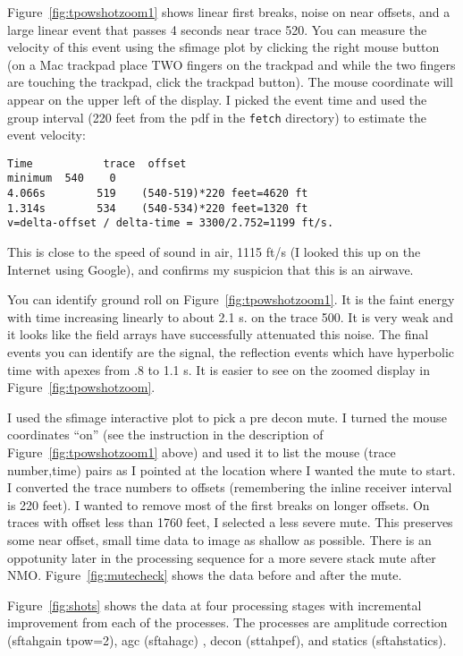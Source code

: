 Figure~\ref{fig:tpowshotzoom1} shows linear first breaks, noise on near offsets, and a large linear event that passes 4 seconds near trace 520.  You can measure the velocity of this event using the sfimage plot by clicking the right mouse button (on a Mac trackpad place TWO fingers on the trackpad and while the two fingers are touching the trackpad, click the trackpad button).  The mouse coordinate will appear on the upper left of the display.  I picked the event time and used the group interval (220 feet from the pdf in the \texttt{fetch} directory) to estimate the event velocity:
\begin{verbatim}  
Time           trace  offset
minimum  540    0
4.066s        519    (540-519)*220 feet=4620 ft
1.314s        534    (540-534)*220 feet=1320 ft
v=delta-offset / delta-time = 3300/2.752=1199 ft/s.
\end{verbatim}  

This is close to the speed of sound in air, 1115 ft/s (I looked this up on the Internet using Google), and confirms my suspicion that this is an airwave.   

You can identify ground roll on Figure~\ref{fig:tpowshotzoom1}.  It is the faint energy with time increasing linearly to about 2.1 s. on the trace 500.  It is very weak and it looks like the field arrays have successfully attenuated this noise.  The final events you can identify are the signal, the reflection events which have hyperbolic time with apexes from .8 to 1.1 s.  It is easier to see on the zoomed display in Figure~\ref{fig:tpowshotzoom}.

I used the sfimage interactive plot to pick a pre decon mute.  I turned the mouse coordinates “on” (see the instruction in the description of Figure~\ref{fig:tpowshotzoom1} above) and used it to list the mouse (trace number,time) pairs as I pointed at the location where I wanted the mute to start.  I converted the trace numbers to offsets (remembering the inline receiver interval is 220 feet).  I wanted to remove most of the first breaks on longer offsets.  On traces with offset less than 1760 feet, I selected a less severe mute.  This preserves some near offset, small time data to image as shallow as possible.  There is an oppotunity later in the processing sequence for a more severe stack mute after NMO.  Figure~\ref{fig:mutecheck} shows the data before and after the mute.

Figure~\ref{fig:shots} shows the data at four processing stages with incremental improvement from each of the processes.  The processes are amplitude correction (sftahgain tpow=2), agc (sftahagc) , decon (sttahpef), and statics (sftahstatics).

